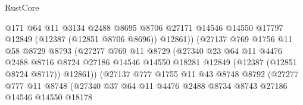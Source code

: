 \begin{lexlean}{RustCore}
\begin{coremodule}
                                  @171
                                  @64
                                  @11
                                  @3134
                                  @2488
                                  @8695
                                  @8706
                                  @27171
                                  @14546
                                  @14550
                                  @17797
                                  @12849
                                  (@12387 (@12851 @8706 @8696))
                                  @12861))
                              (@27137
                                @769
                                @1756
                                @11
                                @58
                                @8729
                                @8793
                                (@27277
                                  @769
                                  @11
                                  @8729
                                  (@27340
                                    @23
                                    @64
                                    @11
                                    @4476
                                    @2488
                                    @8716
                                    @8724
                                    @27186
                                    @14546
                                    @14550
                                    @18281
                                    @12849
                                    (@12387 (@12851 @8724 @8717))
                                    @12861))
                                (@27137
                                  @777
                                  @1755
                                  @11
                                  @43
                                  @8748
                                  @8792
                                  (@27277
                                    @777
                                    @11
                                    @8748
                                    (@27340
                                      @37
                                      @64
                                      @11
                                      @4476
                                      @2488
                                      @8734
                                      @8743
                                      @27186
                                      @14546
                                      @14550
                                      @18178

\end{coremodule}
\end{lexlean}
